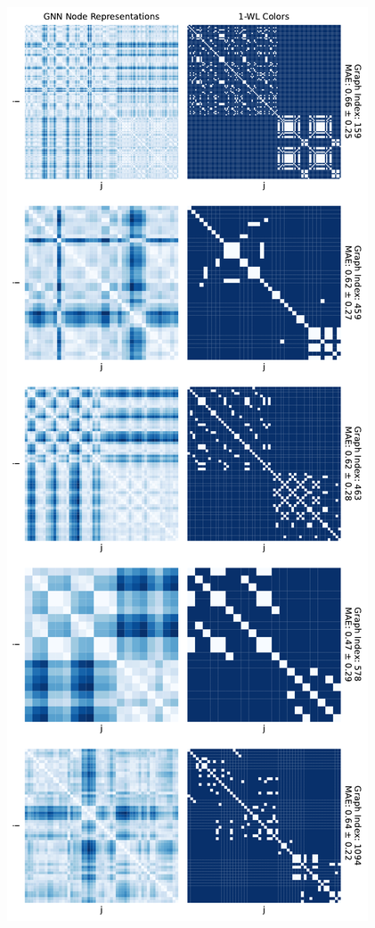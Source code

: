 \begin{figure}[!ht]
    \centering
    \begin{minipage}[b]{0.45992852703\textwidth}
        \centering
        \includegraphics[width=\textwidth, left]{Figures/heatmaps_PROTEINS_0.pdf}

\end{minipage}
\end{figure}
